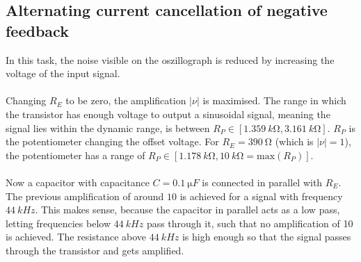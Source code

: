 \documentclass[a4paper,10pt]{article}
\numberwithin{equation}{section}
\begin{document}
\begin{multicols}{2}
	\subsection{Alternating current cancellation of negative feedback}
	In this task, the noise visible on the oszillograph is reduced by increasing the voltage of the input signal.
	\\\\Changing $R_E$ to be zero, the amplification $|\nu |$ is maximised.
	The range in which the transistor has enough voltage to output a sinusoidal signal, meaning the signal lies within the dynamic range, is between $R_P  \in  \left[\SI{1.359}{k\ohm},\SI{3.161}{k\ohm}\right]$.
	$R_P$ is the potentiometer changing the offset voltage.
	For $R_E=\SI{390}{\ohm}$ (which is $|\nu |=1$), the potentiometer has a range of $R_P  \in  \left[\SI{1.178}{k\ohm},\SI{10}{k\ohm}=\text{max}\left(R_P\right)\right]$.
	\\\\Now a capacitor with capacitance $C=\SI{0.1}{\micro F}$ is connected in parallel with $R_E$.
	The previous amplification of around $10$ is achieved for a signal with frequency $\SI{44}{kHz}$.
	This makes sense, because the capacitor in parallel acts as a low pass, letting frequencies below $\SI{44}{kHz}$ pass through it, such that no amplification of 10 is achieved.
	The resistance above $\SI{44}{kHz}$ is high enough so that the signal passes through the transistor and gets amplified.


\end{multicols}
\end{document}
